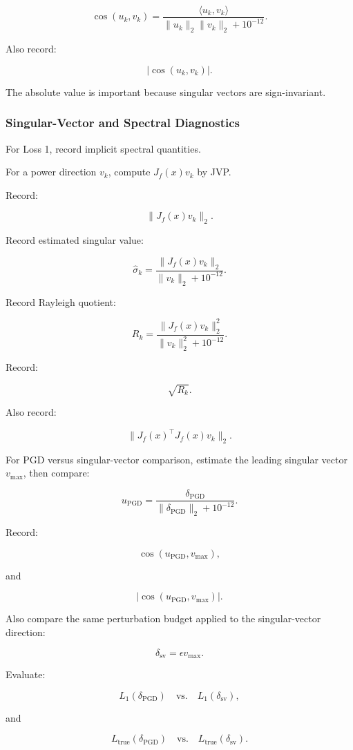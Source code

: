 \documentclass{article}
\begin{document}
\[
\cos(u_k,v_k)
=
\frac{
\langle u_k,v_k\rangle
}{
\|u_k\|_2\|v_k\|_2+10^{-12}
}.
\]

Also record:

\[
|\cos(u_k,v_k)|.
\]

The absolute value is important because singular vectors are sign-invariant.

\subsubsection{Singular-Vector and Spectral Diagnostics}

For Loss 1, record implicit spectral quantities.

For a power direction \(v_k\), compute \(J_f(x)v_k\) by JVP.

Record:

\[
\|J_f(x)v_k\|_2.
\]

Record estimated singular value:

\[
\hat{\sigma}_k
=
\frac{
\|J_f(x)v_k\|_2
}{
\|v_k\|_2+10^{-12}
}.
\]

Record Rayleigh quotient:

\[
R_k
=
\frac{
\|J_f(x)v_k\|_2^2
}{
\|v_k\|_2^2+10^{-12}
}.
\]

Record:

\[
\sqrt{R_k}.
\]

Also record:

\[
\|J_f(x)^\top J_f(x)v_k\|_2.
\]

For PGD versus singular-vector comparison, estimate the leading singular vector \(v_{\max}\), then compare:

\[
u_{\mathrm{PGD}}
=
\frac{
\delta_{\mathrm{PGD}}
}{
\|\delta_{\mathrm{PGD}}\|_2+10^{-12}
}.
\]

Record:

\[
\cos(u_{\mathrm{PGD}},v_{\max}),
\]

and

\[
|\cos(u_{\mathrm{PGD}},v_{\max})|.
\]

Also compare the same perturbation budget applied to the singular-vector direction:

\[
\delta_{\mathrm{sv}}
=
\epsilon v_{\max}.
\]

Evaluate:

\[
L_1(\delta_{\mathrm{PGD}})
\quad
\text{vs.}
\quad
L_1(\delta_{\mathrm{sv}}),
\]

and

\[
L_{\mathrm{true}}(\delta_{\mathrm{PGD}})
\quad
\text{vs.}
\quad
L_{\mathrm{true}}(\delta_{\mathrm{sv}}).
\]
\end{document}
